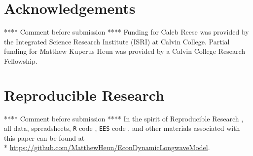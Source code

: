 \documentclass[letterpaper,12pt]{article}
\begin{document}
\section*{Acknowledgements}
\label{sec:Acknowledgements}

**** Comment before submission **** Funding for Caleb Reese was provided by the Integrated Science Research Institute (ISRI) at Calvin College. Partial funding for Matthew Kuperus Heun was provided by a Calvin College Research Fellowship. 

\section*{Reproducible Research}

**** Comment before submission **** In the spirit of Reproducible Research \citep{Gandrud:2013vx}, all data, spreadsheets, \texttt{R} code \citep{R}, \texttt{EES} code \citep{EES}, and other materials associated with this paper can be found at\\*
\protect\url{https://github.com/MatthewHeun/EconDynamicLongwaveModel}.





\end{document}
